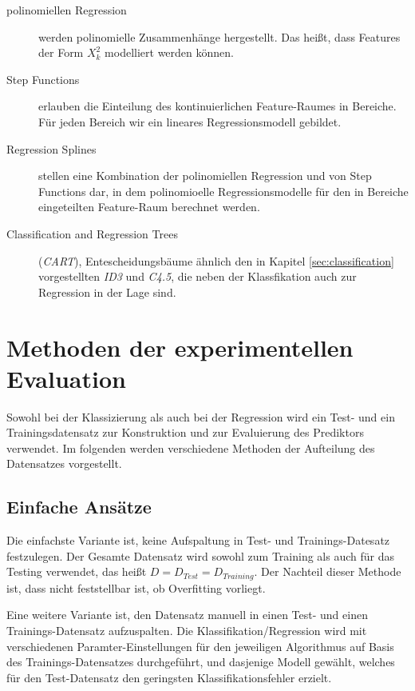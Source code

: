 \begin{description}
\item[polinomiellen Regression] werden polinomielle Zusammenhänge hergestellt. Das heißt, dass Features der Form $X_k^2$ modelliert werden können.
\item[Step Functions] erlauben die Einteilung des kontinuierlichen Feature-Raumes in Bereiche. Für jeden Bereich wir ein lineares Regressionsmodell gebildet. 
\item[Regression Splines] stellen eine Kombination der polinomiellen Regression und von Step Functions dar, in dem polinomioelle Regressionsmodelle für den in Bereiche eingeteilten Feature-Raum berechnet werden.\cite[S. 265 - 266]{statistical_learning}
\item[Classification and Regression Trees] (\emph{CART}), Entescheidungsbäume ähnlich den in Kapitel \ref{sec:classification} vorgestellten \emph{ID3} und \emph{C4.5}, die neben der Klassfikation auch zur Regression in der Lage sind. \cite[S. 145]{machine_marsland}
\end{description}

\section{Methoden der experimentellen Evaluation}

Sowohl bei der Klassizierung als auch bei der Regression wird ein Test- und ein Trainingsdatensatz zur Konstruktion und zur Evaluierung des Prediktors verwendet. Im folgenden werden verschiedene Methoden der Aufteilung des Datensatzes vorgestellt.

\subsection*{Einfache Ansätze}

Die einfachste Variante ist, keine Aufspaltung in Test- und Trainings-Datesatz festzulegen. Der Gesamte Datensatz wird sowohl zum Training als auch für das Testing verwendet, das heißt $D = D_{Test} = D_{Training}$. Der Nachteil dieser Methode ist, dass nicht feststellbar ist, ob Overfitting vorliegt.

Eine weitere Variante ist, den Datensatz manuell in einen Test- und einen Trainings-Datensatz aufzuspalten. Die Klassifikation/Regression wird mit verschiedenen Paramter-Einstellungen für den jeweiligen Algorithmus auf Basis des Trainings-Datensatzes durchgeführt, und dasjenige Modell gewählt, welches für den Test-Datensatz den geringsten Klassifikationsfehler erzielt. \cite[S. 227]{machine_kubat}

